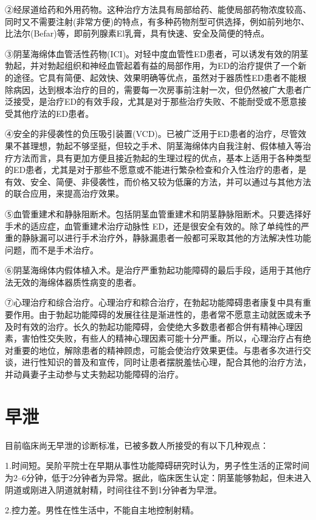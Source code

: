 \documentclass[12pt,UTF8]{ctexbook}
\begin{document}
②经尿道给药和外用药物。这种治疗方法具有局部给药、能使局部药物浓度较高、同时又不需要注射(非常方便)的特点，有多种药物剂型可供选择，例如前列地尔、比法尔(Befar)等，即前列腺素El乳膏，具有快速、安全及简便的特点。

③阴茎海绵体血管活性药物(ICI)。对轻中度血管性ED患者，可以诱发有效的阴茎勃起，并对勃起组织和神经血管起着有益的局部作用，为ED的治疗提供了一个新的途径。它具有简便、起效快、效果明确等优点，虽然对于器质性ED患者不能根除病因，达到根本治疗的目的，需要每一次房事前注射一次，但仍然被广大患者广泛接受，是治疗ED的有效手段，尤其是对于那些治疗失败、不能耐受或不愿意接受其他疗法的ED患者。

④安全的非侵袭性的负压吸引装置(VCD)。已被广泛用于ED患者的治疗，尽管效果不甚理想，勃起不够坚挺，但较之手术、阴茎海绵体内自我注射、假体植入等治疗方法而言，具有更加方便且接近勃起的生理过程的优点，基本上适用于各种类型的ED患者，尤其是对于那些不愿意或不能进行繁杂检查和介入性治疗的患者，是有效、安全、简便、非侵袭性，而价格又较为低廉的方法，并可以通过与其他方法的联合应用，来提高治疗效果。

⑤血管重建术和静脉阻断术。包括阴茎血管重建术和阴茎静脉阻断术。只要选择好手术的适应症，血管重建术治疗动脉性 ED，还是很安全有效的。除了单纯性的严重的静脉漏可以进行手术治疗外，静脉漏患者一般都可采取其他的方法解决性功能问题，而不是手术治疗。

⑥阴茎海绵体内假体植入术。是治疗严重勃起功能障碍的最后手段，适用于其他疗法无效的海绵体器质性病变的患者。

⑦心理治疗和综合治疗。心理治疗和粽合治疗，在勃起功能障碍患者康复中具有重要作用。由于勃起功能障碍的发展往往是渐进性的，患者常不愿意主动就医或未予及时有效的治疗。长久的勃起功能障碍，会使绝大多数患者都合併有精神心理因素，害怕性交失败，有些人的精神心理因素可能十分严重。所以，心理治疗占有绝对重要的地位，解除患者的精神顾虑，可能会使治疗效果更佳。与患者多次进行交谈，进行性知识的普及和宣传，同时让患者摆脱羞怯心理，配合其他的治疗方法，并动員妻子主动参与丈夫勃起功能障碍的治疗。

\chapter{早泄}

目前临床尚无早泄的诊断标准，已被多数人所接受的有以下几种观点：

1.时间短。吴阶平院士在早期从事性功能障碍研究时认为，男子性生活的正常时间为2--6分钟，低于2分钟者为异常。据此，临床医生认定：阴茎能够勃起，但未进入阴道或刚进入阴道就射精，时间往往不到1分钟者为早泄。

2.控力差。男性在性生活中，不能自主地控制射精。
\end{document}
